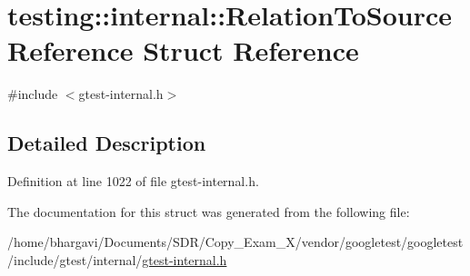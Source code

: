 \hypertarget{structtesting_1_1internal_1_1_relation_to_source_reference}{}\section{testing\+:\+:internal\+:\+:Relation\+To\+Source\+Reference Struct Reference}
\label{structtesting_1_1internal_1_1_relation_to_source_reference}


{\ttfamily \#include $<$gtest-\/internal.\+h$>$}



\subsection{Detailed Description}


Definition at line 1022 of file gtest-\/internal.\+h.



The documentation for this struct was generated from the following file\+:\begin{DoxyCompactItemize}
\item 
/home/bhargavi/\+Documents/\+S\+D\+R/\+Copy\+\_\+\+Exam\+\_\+X/vendor/googletest/googletest/include/gtest/internal/\hyperlink{gtest-internal_8h}{gtest-\/internal.\+h}\end{DoxyCompactItemize}
